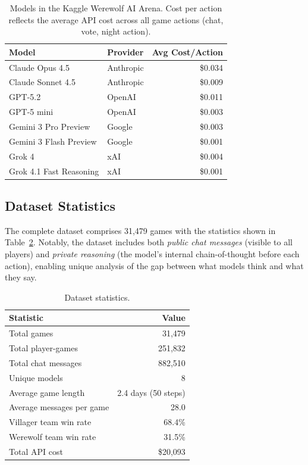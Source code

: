 \begin{table}[t]
\caption{Models in the Kaggle Werewolf AI Arena. Cost per action reflects the average API cost across all game actions (chat, vote, night action).}
\label{tab:models}
\centering
\small
\begin{tabular}{llr}
\toprule
\textbf{Model} & \textbf{Provider} & \textbf{Avg Cost/Action} \\
\midrule
Claude Opus 4.5 & Anthropic & \$0.034 \\
Claude Sonnet 4.5 & Anthropic & \$0.009 \\
GPT-5.2 & OpenAI & \$0.011 \\
GPT-5 mini & OpenAI & \$0.003 \\
Gemini 3 Pro Preview & Google & \$0.003 \\
Gemini 3 Flash Preview & Google & \$0.001 \\
Grok 4 & xAI & \$0.004 \\
Grok 4.1 Fast Reasoning & xAI & \$0.001 \\
\bottomrule
\end{tabular}
\end{table}

\subsection{Dataset Statistics}

The complete dataset comprises 31,479 games with the statistics shown in Table~\ref{tab:dataset_stats}. Notably, the dataset includes both \emph{public chat messages} (visible to all players) and \emph{private reasoning} (the model's internal chain-of-thought before each action), enabling unique analysis of the gap between what models think and what they say.

\begin{table}[t]
\caption{Dataset statistics.}
\label{tab:dataset_stats}
\centering
\small
\begin{tabular}{lr}
\toprule
\textbf{Statistic} & \textbf{Value} \\
\midrule
Total games & 31,479 \\
Total player-games & 251,832 \\
Total chat messages & 882,510 \\
Unique models & 8 \\
Average game length & 2.4 days (50 steps) \\
Average messages per game & 28.0 \\
Villager team win rate & 68.4\% \\
Werewolf team win rate & 31.5\% \\
Total API cost & \$20,093 \\
\bottomrule
\end{tabular}
\end{table}

